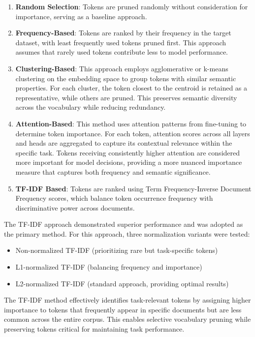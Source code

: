 \documentclass[twocolumn]{article}
\begin{document}
\begin{enumerate}
    \item \textbf{Random Selection}: Tokens are pruned randomly without consideration for importance, serving as a baseline approach.
    
    \item \textbf{Frequency-Based}: Tokens are ranked by their frequency in the target dataset, with least frequently used tokens pruned first. This approach assumes that rarely used tokens contribute less to model performance.
    
    \item \textbf{Clustering-Based}: This approach employs agglomerative or k-means clustering on the embedding space to group tokens with similar semantic properties. For each cluster, the token closest to the centroid is retained as a representative, while others are pruned. This preserves semantic diversity across the vocabulary while reducing redundancy.
    
    \item \textbf{Attention-Based}: This method uses attention patterns from fine-tuning to determine token importance. For each token, attention scores across all layers and heads are aggregated to capture its contextual relevance within the specific task. Tokens receiving consistently higher attention are considered more important for model decisions, providing a more nuanced importance measure that captures both frequency and semantic significance.
    
    \item \textbf{TF-IDF Based}: Tokens are ranked using Term Frequency-Inverse Document Frequency scores, which balance token occurrence frequency with discriminative power across documents.
\end{enumerate}

The TF-IDF approach demonstrated superior performance and was adopted as the primary method. For this approach, three normalization variants were tested:
\begin{itemize}
    \item Non-normalized TF-IDF (prioritizing rare but task-specific tokens)
    \item L1-normalized TF-IDF (balancing frequency and importance)
    \item L2-normalized TF-IDF (standard approach, providing optimal results)
\end{itemize}

The TF-IDF method effectively identifies task-relevant tokens by assigning higher importance to tokens that frequently appear in specific documents but are less common across the entire corpus. This enables selective vocabulary pruning while preserving tokens critical for maintaining task performance.
\end{document}
